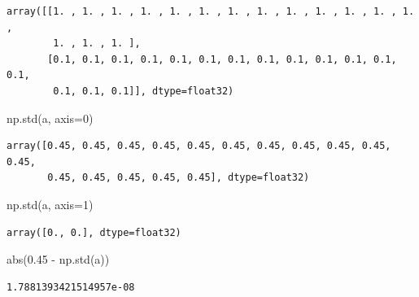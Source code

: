 \documentclass[
  letterpaper,
  DIV=11,
  numbers=noendperiod]{scrreprt}
\newenvironment{Shaded}{\begin{snugshade}}{\end{snugshade}}
\newcommand{\BuiltInTok}[1]{\textcolor[rgb]{0.00,0.23,0.31}{#1}}
\newcommand{\DecValTok}[1]{\textcolor[rgb]{0.68,0.00,0.00}{#1}}
\newcommand{\FloatTok}[1]{\textcolor[rgb]{0.68,0.00,0.00}{#1}}
\newcommand{\NormalTok}[1]{\textcolor[rgb]{0.00,0.23,0.31}{#1}}
\newcommand{\OperatorTok}[1]{\textcolor[rgb]{0.37,0.37,0.37}{#1}}
\begin{document}
\begin{verbatim}
array([[1. , 1. , 1. , 1. , 1. , 1. , 1. , 1. , 1. , 1. , 1. , 1. , 1. ,
        1. , 1. , 1. ],
       [0.1, 0.1, 0.1, 0.1, 0.1, 0.1, 0.1, 0.1, 0.1, 0.1, 0.1, 0.1, 0.1,
        0.1, 0.1, 0.1]], dtype=float32)
\end{verbatim}

\begin{Shaded}
\begin{Highlighting}[]
\NormalTok{np.std(a, axis}\OperatorTok{=}\DecValTok{0}\NormalTok{)}
\end{Highlighting}
\end{Shaded}

\begin{verbatim}
array([0.45, 0.45, 0.45, 0.45, 0.45, 0.45, 0.45, 0.45, 0.45, 0.45, 0.45,
       0.45, 0.45, 0.45, 0.45, 0.45], dtype=float32)
\end{verbatim}

\begin{Shaded}
\begin{Highlighting}[]
\NormalTok{np.std(a, axis}\OperatorTok{=}\DecValTok{1}\NormalTok{)}
\end{Highlighting}
\end{Shaded}

\begin{verbatim}
array([0., 0.], dtype=float32)
\end{verbatim}

\begin{Shaded}
\begin{Highlighting}[]
\BuiltInTok{abs}\NormalTok{(}\FloatTok{0.45} \OperatorTok{{-}}\NormalTok{ np.std(a))}
\end{Highlighting}
\end{Shaded}

\begin{verbatim}
1.7881393421514957e-08
\end{verbatim}
\end{document}
